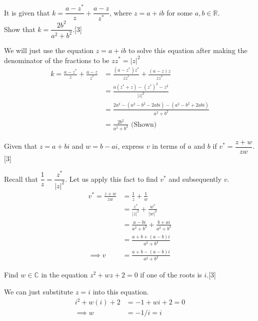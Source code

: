 \documentclass[12pt, a4 paper]{article}
\begin{document}
\begin{outline}[enumerate]
	\2 It is given that $k=\dfrac{a-z^*}{z}+\dfrac{a-z}{z^*}$, where $z=a+ib$ for some $a,b \in \mathbb{R}$.\\Show that $k=\dfrac{2b^2}{a^2+b^2}$.\hfill[3] %
	\begin{answer}
		We will just use the equation $z=a+ib$ to solve this equation after making the denominator of the fractions to be $zz^*=|z|^2$
		\begin{align*}
			k = \frac{a-z^*}{z}+\frac{a-z}{z^*} & = \frac{(a-z^*)z^*}{zz^*} +\frac{(a-z)z}{zz^*}        \\ 
			                                    & =  \frac{a(z^*+z)-(z^*)^2-z^2}{|z|^2}                 \\
			                                    & =  \frac{2a^2-(a^2-b^2-2abi)-(a^2-b^2+2abi)}{a^2+b^2} \\
			                                    & = \frac{2b^2}{a^2+b^2} \textrm{ (Shown)}              
		\end{align*}
	\end{answer}
			        
	\2 Given that $z=a+bi$ and $w=b-ai$, express $v$ in terms of $a$ and $b$ if $v^*=\dfrac{z+w}{zw}$.\hfill[3] %
	\begin{answer}
		Recall that $\dfrac{1}{z} = \dfrac{z^*}{|z|^2}$. Let us apply this fact to find $v^*$ and subsequently $v$.
		\begin{align*}
			v^*=\frac{z+w}{zw} & = \frac{1}{z}+\frac{1}{w}                   \\
			                   & = \frac{z^*}{|z|^2}+\frac{w^*}{|w|^2}       \\
			                   & = \frac{a-bi}{a^2+b^2}+\frac{b+ai}{a^2+b^2} \\
			                   & = \frac{a+b+(a-b)i}{a^2+b^2}                \\
			\implies v         & =\frac{a+b-(a-b)i}{a^2+b^2}                 
		\end{align*}
	\end{answer}
			        
	\2 Find $w \in \mathbb{C}$ in the equation $z^2+wz+2=0$ if one of the roots is $i$.\hfill[3] %
	\begin{answer}
		We can just substitute $z=i$ into this equation.
		\begin{align*}
			i^2+w(i)+2 & =-1+wi+2=0 \\
			\implies w & =-1/i=i    
		\end{align*}
	\end{answer}
			        

\end{outline}
\end{document}
